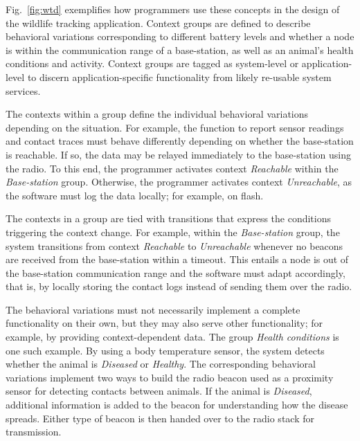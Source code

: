 Fig.~\ref{fig:wtd} exemplifies how programmers use these concepts in
the design of the wildlife tracking application. Context groups are
defined to describe behavioral variations corresponding to different
battery levels and whether a node is within the communication range of
a base-station, as well as an animal's health conditions and
activity. Context groups are tagged as system-level or
application-level to discern application-specific functionality from
likely re-usable system services.

The contexts within a group define the individual behavioral
variations depending on the situation. For example, the function to
report sensor readings and contact traces must behave differently
depending on whether the base-station is reachable.  If so, the data
may be relayed immediately to the base-station using the radio. To
this end, the programmer activates context \emph{Reachable} within the
\emph{Base-station} group. Otherwise, the programmer activates context
\emph{Unreachable}, as the software must log the data locally; for
example, on flash. 

The contexts in a group are tied with transitions that
express the conditions triggering the context change. For example,
within the \emph{Base-station} group, the system transitions from
context \emph{Reachable} to \emph{Unreachable} whenever no beacons are
received from the base-station within a timeout. This entails
a node is out of the base-station communication range and the software
must adapt accordingly, that is, by locally storing the contact logs
instead of sending them over the radio.


The behavioral variations must not necessarily implement a complete
functionality on their own, but they may also serve other
functionality; for example, by providing context-dependent data. The
group \emph{Health conditions} is one such example. By using a body
temperature sensor, the system detects whether the animal is
\emph{Diseased} or \emph{Healthy}. The corresponding behavioral
variations implement two ways to build the radio beacon used as a
proximity sensor for detecting contacts between animals. If the animal
is \emph{Diseased}, additional information is added to the beacon for
understanding how the disease spreads. Either type of beacon is then
handed over to the radio stack for transmission.

